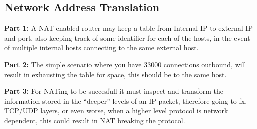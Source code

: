
\subsection{Network Address Translation}
\textbf{Part 1: } A NAT-enabled router may keep a table from Internal-IP to
external-IP and port, also keeping track of some identifier for each of the
hosts, in the event of multiple internal hosts connecting to the same external
host.

\textbf{Part 2: } The simple scenario where you have 33000 connections
outbound, will result in exhausting the table for space, this should be to the
same host.

\textbf{Part 3: } For NATing to be succesfull it must inspect and transform the
information stored in the ``deeper'' levels of an IP packet, therefore going to
fx. TCP/UDP layers, or even worse, when a higher level protocol is network
dependent, this could result in NAT breaking the protocol.
